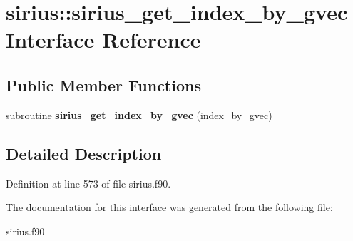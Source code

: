 \hypertarget{interfacesirius_1_1sirius__get__index__by__gvec}{}\section{sirius\+:\+:sirius\+\_\+get\+\_\+index\+\_\+by\+\_\+gvec Interface Reference}
\label{interfacesirius_1_1sirius__get__index__by__gvec}
\subsection*{Public Member Functions}
\begin{DoxyCompactItemize}
\item 
\hypertarget{interfacesirius_1_1sirius__get__index__by__gvec_ab3eba4fa0a970ca38a11c036a38d964d}{}subroutine {\bfseries sirius\+\_\+get\+\_\+index\+\_\+by\+\_\+gvec} (index\+\_\+by\+\_\+gvec)\label{interfacesirius_1_1sirius__get__index__by__gvec_ab3eba4fa0a970ca38a11c036a38d964d}

\end{DoxyCompactItemize}


\subsection{Detailed Description}


Definition at line 573 of file sirius.\+f90.



The documentation for this interface was generated from the following file\+:\begin{DoxyCompactItemize}
\item 
sirius.\+f90\end{DoxyCompactItemize}
